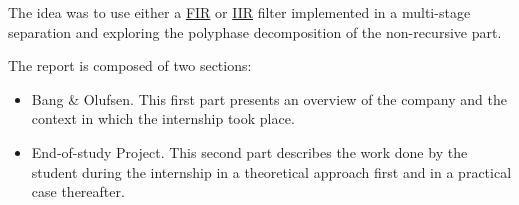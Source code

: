 The idea was to use either a \hyperlink{FIR}{FIR} or \hyperlink{IIR}{IIR} filter implemented in a multi-stage separation and exploring the polyphase decomposition of the non-recursive part. 



The report is composed of two sections:

\begin{itemize}

\item Bang \& Olufsen. This first part presents an overview of the company and the context in which the internship took place.

\item End-of-study Project. This second part describes the work done by the student during the internship in a theoretical approach first and in a practical case thereafter.

\end{itemize}